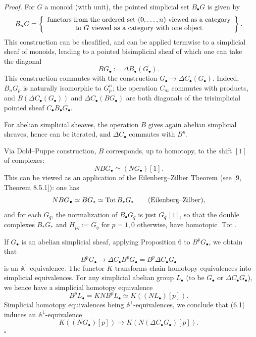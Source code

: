 \documentclass[11pt]{article}
\newcommand{\Aone}{\mathbb A^1}
\newcommand{\Tot}{\operatorname{Tot}}
\theoremstyle{deligne}
\newenvironment{proofdel}{\noindent\textit{Proof.}}{\hfill$\square$}
\begin{document}
\begin{proofdel}
For \(G\) a monoid (with unit), the pointed simplicial set \(B_\bullet G\) is given by
\[
B_nG=\left\{
\begin{array}{c}
\hbox{functors from the ordered set }(0,\ldots,n)\hbox{ viewed as a category}\\
\hbox{to }G\hbox{ viewed as a category with one object}
\end{array}
\right\}.
\]
This construction can be sheafified, and can be applied termwise to a simplicial sheaf of monoids, leading to a pointed bisimplicial sheaf of which one can take the diagonal
\[
BG_\bullet:=\Delta B_\bullet(G_\bullet).
\]
This construction commutes with the construction \(G_\bullet\to\Delta C_\bullet(G_\bullet)\). Indeed, \(B_nG_p\) is naturally isomorphic to \(G_p^n\); the operation \(C_m\) commutes with products, and \(B(\Delta C_\bullet(G_\bullet))\) and \(\Delta C_\bullet(BG_\bullet)\) are both diagonals of the trisimplicial pointed sheaf \(C_\bullet B_\bullet G_\bullet\).

For abelian simplicial sheaves, the operation \(B\) gives again abelian simplicial sheaves, hence can be iterated, and \(\Delta C_\bullet\) commutes with \(B^n\).

Via Dold--Puppe construction, \(B\) corresponds, up to homotopy, to the shift \([1]\) of complexes:
\[
NBG_\bullet\simeq(NG_\bullet)[1].
\]
This can be viewed as an application of the Eilenberg--Zilber Theorem (see [9, Theorem 8.5.1]): one has
\[
NBG_\bullet\simeq BG_*\simeq \Tot B_*G_*\qquad\hbox{(Eilenberg--Zilber),}
\]
and for each \(G_q\), the normalization of \(B_\bullet G_q\) is just \(G_q[1]\), so that the double complexes \(B_*G_*\) and \(H_{pq}:=G_q\) for \(p=1,0\) otherwise, have homotopic \(\Tot\).

If \(G_\bullet\) is an abelian simplicial sheaf, applying Proposition 6 to \(B^pG_\bullet\), we obtain that
\[
B^pG_\bullet\longrightarrow \Delta C_\bullet B^pG_\bullet
       =B^p\Delta C_\bullet G_\bullet                       \tag{6.1}
\]
is an \(\Aone\)-equivalence. The functor \(K\) transforms chain homotopy equivalences into simplicial equivalences. For any simplicial abelian group \(L_\bullet\) (to be \(G_\bullet\) or \(\Delta C_\bullet G_\bullet\)), we hence have a simplicial homotopy equivalence
\[
B^pL_\bullet=KNB^pL_\bullet\simeq K((NL_\bullet)[p]).
\]
Simplicial homotopy equivalences being \(\Aone\)-equivalences, we conclude that (6.1) induces an \(\Aone\)-equivalence
\[
K((NG_\bullet)[p])\longrightarrow K(N(\Delta C_\bullet G_\bullet)[p]).
\]
\end{proofdel}
\end{document}
